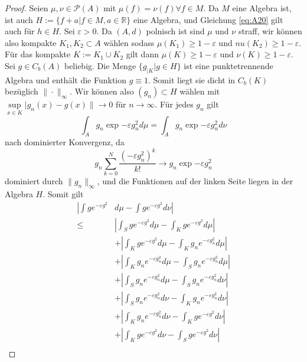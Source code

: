 \begin{proof}
    Seien $\mu, \nu \in \mathcal{P}(A)$ mit $\mu(f)=\nu(f)\forall f\in M$. Da $M$ eine Algebra ist, ist auch $H:=\{f+a \vert f \in M, a\in \mathbb{R}\}$ eine Algebra, und Gleichung \ref{eq:A20} gilt auch für $h \in H$. Sei $\varepsilon>0$. Da $(A, d)$ polnisch ist sind $\mu$ und $\nu$ straff, wir können also kompakte $K_1,K_2 \subset A$ wählen sodass $\mu(K_1)\geq 1-\varepsilon$ und $nu(K_2)\geq 1-\varepsilon$. Für das kompakte $K:=K_1\cup K_2$ gilt dann $\mu(K)\geq 1-\varepsilon$ und $\nu(K)\geq 1-\varepsilon$. Sei $g \in C_b(A)$ beliebig. Die Menge $\{g_{\vert K} \vert g \in H\}$ ist eine punktetrennende Algebra und enthält die Funktion $g\equiv 1$. Somit liegt sie dicht in $C_b(K)$ bezüglich $\|\cdot \|_\infty$. Wir können also $(g_n) \subset H$ wählen mit $\sup\limits_{x\in K} |g_n(x)-g(x)\| \rightarrow 0$ für $n\rightarrow \infty$. Für jedes $g_n$ gilt
    \begin{equation}\label{eq:A21}
    \int_A g_n \exp{-\varepsilon g_n^2} d\mu = \int_A g_n \exp{-\varepsilon g_n^2} d\nu
    \end{equation}
    nach dominierter Konvergenz, da 
    $$ g_n \sum_{k=0}^{N} \frac{(-\varepsilon g_n^2)^k}{k!} \rightarrow g_n \exp{-\varepsilon g_n^2}$$
    dominiert durch $\|g_n\|_{\infty}$, und die Funktionen auf der linken Seite liegen in der Algebra $H$. Somit gilt
    \begin{align*}
        \left| \int ge^{-\varepsilon g^2}\right. & \left. d\mu - \int ge^{-\varepsilon g^2}d\nu \right|  \\
        \leq &\left| \int_S ge^{-\varepsilon g^2}d\mu - \int_K ge^{-\varepsilon g^2}d\mu \right| \\
        &+ \left| \int_K ge^{-\varepsilon g^2}d\mu - \int_K g_ne^{-\varepsilon g_n^2}d\mu \right| \\
        &+ \left| \int_K g_ne^{-\varepsilon g_n^2}d\mu - \int_S g_ne^{-\varepsilon g_n^2}d\mu \right| \\
        &+ \left| \int_S g_ne^{-\varepsilon g_n^2}d\mu - \int_S g_ne^{-\varepsilon g_n^2}d\nu \right| \\
        &+ \left| \int_S g_ne^{-\varepsilon g_n^2}d\nu - \int_K g_ne^{-\varepsilon g_n^2}d\nu \right| \\
        &+ \left| \int_K g_ne^{-\varepsilon g_n^2}d\nu - \int_K ge^{-\varepsilon g^2}d\nu \right| \\
        &+ \left| \int_K ge^{-\varepsilon g^2}d\nu - \int_S ge^{-\varepsilon g^2}d\nu \right| \\

\end{align*}
\end{proof}
